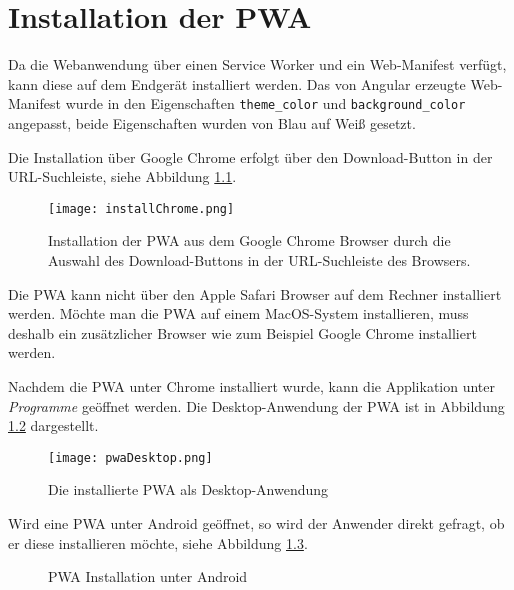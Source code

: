 \chapter{Installation der PWA}

Da die Webanwendung über einen Service Worker und ein Web-Manifest verfügt, kann diese auf dem Endgerät installiert werden. Das von Angular erzeugte Web-Manifest wurde in den Eigenschaften \texttt{theme\_color} und \texttt{background\_color} angepasst, beide Eigenschaften wurden von Blau auf Weiß gesetzt.

Die Installation über Google Chrome erfolgt über den Download-Button in der URL-Suchleiste, siehe Abbildung \ref{img:installChrome}.

\begin{figure}[!htb]
    \centering
    \texttt{[image: installChrome.png]}
    \caption{Installation der PWA aus dem Google Chrome Browser durch die Auswahl des Download-Buttons in der URL-Suchleiste des Browsers.}
    \label{img:installChrome}
\end{figure}

Die PWA kann nicht über den Apple Safari Browser auf dem Rechner installiert werden. Möchte man die PWA auf einem MacOS-System installieren, muss deshalb ein zusätzlicher Browser wie zum Beispiel Google Chrome installiert werden. 

Nachdem die PWA unter Chrome installiert wurde, kann die Applikation unter \textit{Programme} geöffnet werden. Die Desktop-Anwendung der PWA ist in Abbildung \ref{img:desktopPwa} dargestellt.

\begin{figure}[!htb]
    \centering
    \texttt{[image: pwaDesktop.png]}
    \caption{Die installierte PWA als Desktop-Anwendung}
    \label{img:desktopPwa}
\end{figure}


Wird eine PWA unter Android geöffnet, so wird der Anwender direkt gefragt, ob er diese installieren möchte, siehe Abbildung \ref{img:installAndroid}.

\begin{figure}%
    \centering
    \qquad
    \caption{PWA Installation unter Android}%
    \label{img:installAndroid}
  \end{figure}

